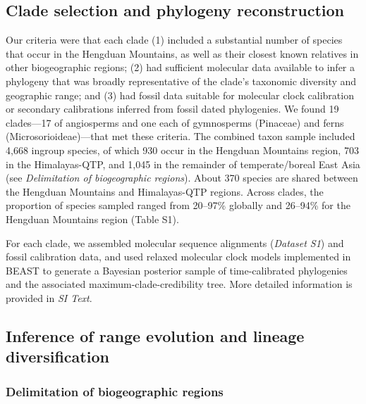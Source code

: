 
\subsection*{Clade selection and phylogeny reconstruction}

Our criteria were that each clade (1) included a substantial number of
species that occur in the Hengduan Mountains, as well as their closest
known relatives in other biogeographic regions; (2) had sufficient
molecular data available to infer a phylogeny that was broadly
representative of the clade's taxonomic diversity and geographic
range; and (3) had fossil data suitable for molecular clock
calibration or secondary calibrations inferred from fossil dated
phylogenies. We found 19 clades---17 of angiosperms and one each of
gymnosperms (Pinaceae) and ferns (Microsorioideae)---that met these
criteria. The combined taxon sample included 4,668 ingroup species, of
which 930 occur in the Hengduan Mountains region, 703 in the
Himalayas-QTP, and 1,045 in the remainder of temperate/boreal East
Asia (see \textit{Delimitation of biogeographic regions}). About 370
species are shared between the Hengduan Mountains and Himalayas-QTP
regions. Across clades, the proportion of species sampled ranged from
20--97\% globally and 26--94\% for the Hengduan Mountains region
(Table S1).

For each clade, we assembled molecular sequence alignments
(\textit{Dataset S1}) and fossil calibration data, and used relaxed
molecular clock models implemented in BEAST
\citep{Drummond2012,Bouckaert2014} to generate a Bayesian posterior
sample of time-calibrated phylogenies and the associated
maximum-clade-credibility tree.  More detailed information is provided
in \textit{SI Text}.


\subsection*{Inference of range evolution and lineage diversification}

\subsubsection*{Delimitation of biogeographic regions}

